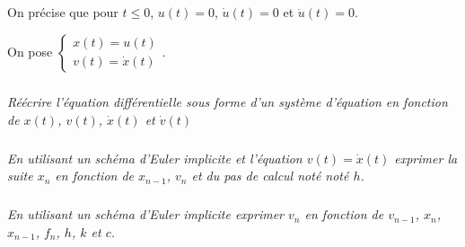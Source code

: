 \documentclass[10pt]{article}
\newif\ifprof
\begin{document}
On précise que pour $t\leq 0$, $u(t)=0$, $\dot{u}(t)=0$ et $\ddot{u}(t)=0$.

On pose $\left\{ \begin{array}{l} x(t) = u(t) \\ v(t) = \dot{x}(t)\end{array} \right.$.



\subparagraph{}
\textit{Réécrire l'équation différentielle sous forme d'un système d'équation en fonction de $x(t)$,  $v(t)$, $\dot{x}(t)$ et $\dot{v}(t)$}
\ifprof
\begin{corrige}
On a donc : 
$$
\left\{ 
\begin{array}{l} 
v(t) = \dot{x}(t) \\ 
m\cdot\dot{v}(t)+c\cdot {v}(t) + k\cdot x(t) = f(t)
\end{array} \right.
$$
\end{corrige}
\else
\fi

%

\subparagraph{}
\textit{En utilisant un schéma d'Euler implicite et l'équation $v(t) = \dot{x}(t)$ 
exprimer la suite $x_{n}$ en fonction de $x_{n-1}$, $v_n$ et du pas de calcul noté noté $h$.}

\ifprof
\begin{corrige}
On a $\dfrac{dx(t)}{dt} \simeq \dfrac{x_{n}-x_ {n-1}}{h}$. On a donc 
$v_n = \dfrac{x_{n}-x_{n-1}}{h} \Longleftrightarrow x_{n} = h\cdot v_n + x_{n-1}$.

\end{corrige}
\else
\fi


\subparagraph{}
\textit{En utilisant un schéma d'Euler implicite exprimer $v_n$ en fonction de $v_{n-1}$, $x_{n}$, $x_{n-1}$, $f_n$, $h$, $k$ et $c$.}

\ifprof
\begin{corrige}

On a $\dfrac{dv(t)}{dt} \simeq \dfrac{v_{n}-v_ {n-1}}{h}$. On a donc 
$\dot{v}_n = \dfrac{v_{n}-v_{n-1}}{h} \Longleftrightarrow v_{n} = h\cdot \dot{v}_n + v_{n-1}$.


$$
m\cdot \dfrac{v_{n}-v_{n-1}}{h} +c\cdot \dfrac{x_{n}-x_{n-1}}{h} + k\cdot x_n = f_n
\Longleftrightarrow
m\cdot (v_{n}-v_{n-1}) +c\cdot (x_{n}-x_{n-1}) + kh\cdot x_n = hf_n
$$


On a donc :
$$
mv_{n}  = hf_n -  (kh+c) \cdot x_n + mv_{n-1}+cx_{n-1}
$$

\end{corrige}
\else
\fi
\end{document}
